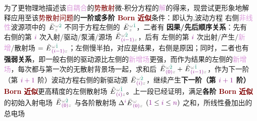 为了更物理地描述该\textcolor{Plum}{自耦合}的\textcolor{Maroon}{势散射}微-积分方程的\textcolor{Plum}{解}的得来，现尝试更形象地解释应用至该\textcolor{Maroon}{势散射问题}的\textbf{一阶或多阶 \textcolor{Maroon}{Born 近似}}\cite{bornPrinciplesOptics60th2019}条件：即认为,波动方程  右侧\textcolor{Plum}{非线性}\textcolor{NavyBlue}{波源}项中的 $\xint{\mathcolor{gray}{-}}{255}{\bar{E}}^{\;\! \mathcolor{gray}{\omega} \textcolor{PineGreen}{\hat{2}}}_{\;\! \mathcolor{gray}{z}}$ 不同于方程左侧的 $\xint{\mathcolor{gray}{-}}{255}{\bar{E}}^{\;\! \mathcolor{gray}{\omega} \textcolor{PineGreen}{\hat{1}}}_{\;\! \mathcolor{gray}{z}}$，二者有 {\one} \textbf{因果/先后顺序关系}：先有  右侧的第 $\textcolor{Plum}{i}$ 次\textcolor{NavyBlue}{入射}/\textcolor{NavyBlue}{驱动}/\textcolor{NavyBlue}{泵浦}/\textcolor{NavyBlue}{源场} $\xint{\mathcolor{gray}{-}}{255}{\bar{E}}^{\;\! \mathcolor{gray}{\omega} \textcolor{PineGreen}{\hat{2}}}_{\;\! \textcolor{Plum}{(i-1)} \mathcolor{gray}{z}}$，后有  左侧的第 $\textcolor{Plum}{i}$ 次\textcolor{NavyBlue}{出射}/\textcolor{NavyBlue}{产生}/\textcolor{Plum}{新增}/\textcolor{NavyBlue}{散射场} $ = \xint{\mathcolor{gray}{-}}{255}{\tilde{E}}^{\;\! \mathcolor{gray}{\omega} \textcolor{PineGreen}{\hat{1}}}_{\;\! \textcolor{Plum}{(i-1)} \mathcolor{gray}{z}}$；左侧慢半拍，对应是结果，右侧是原因；同时，二者也有 {\two} \textbf{强弱关系}，即一般右侧的\textcolor{NavyBlue}{驱动源}比左侧的\textcolor{Plum}{新增场}更强，而作为结果的左侧的\textcolor{Plum}{新增场}，每次都与第一次的\textcolor{NavyBlue}{无散射背景场}一起，求和后 $\xint{\mathcolor{gray}{-}}{255}{\bar{E}}^{\;\! \mathcolor{gray}{\omega} \textcolor{PineGreen}{\hat{2}}}_{\;\! \textcolor{Plum}{(0)} \mathcolor{gray}{z}} + \xint{\mathcolor{gray}{-}}{255}{\tilde{E}}^{\;\! \mathcolor{gray}{\omega} \textcolor{PineGreen}{\hat{1}}}_{\;\! \textcolor{Plum}{(i-1)} \mathcolor{gray}{z}}$，作为下一阶（第 $\textcolor{Plum}{i+1}$ 阶）波动方程右侧的\textcolor{NavyBlue}{新驱动源} $\xint{\mathcolor{gray}{-}}{255}{\bar{E}}^{\;\! \mathcolor{gray}{\omega} \textcolor{PineGreen}{\hat{2}}}_{\;\! \textcolor{Plum}{(i)} \mathcolor{gray}{z}}$，继续产生\textbf{下一阶（第 $\textcolor{Plum}{i+1}$ 阶）\textcolor{Maroon}{Born 近似}}更高精度的左侧\textcolor{NavyBlue}{散射场} $\xint{\mathcolor{gray}{-}}{255}{\tilde{E}}^{\;\! \mathcolor{gray}{\omega} \textcolor{PineGreen}{\hat{1}}}_{\;\! \textcolor{Plum}{(i)} \mathcolor{gray}{z}}$。上一段已经证明，满足\textbf{各阶 \textcolor{Maroon}{Born 近似}}  的初始\textcolor{NavyBlue}{入射电场} $\xint{\mathcolor{gray}{-}}{255}{\bar{E}}^{\;\! \mathcolor{gray}{\omega} \textcolor{PineGreen}{\hat{2}}}_{\;\! \textcolor{Plum}{(0)} \mathcolor{gray}{z}}$ 与各阶\textcolor{NavyBlue}{散射场} $\Delta^{\textcolor{Plum}{i}} \xint{\mathcolor{gray}{-}}{295}{\bar{E}}^{\;\! \mathcolor{gray}{\omega} }_{\;\! \textcolor{Plum}{(0)} \mathcolor{gray}{z}}$ $\left( \textcolor{Plum}{1} \leq \textcolor{Plum}{i} \leq \textcolor{Plum}{n} \right)$ 之和，所线性叠加出的\textcolor{NavyBlue}{总电场} 